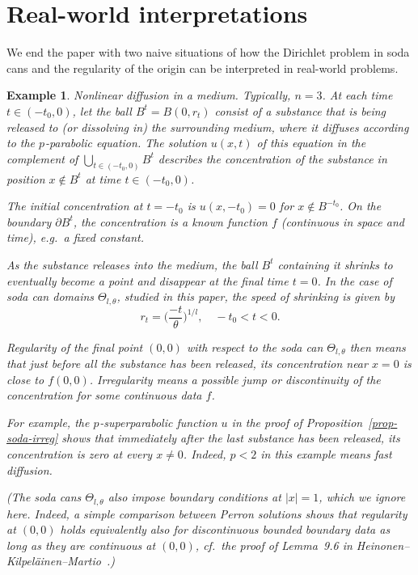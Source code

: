 \documentclass[a4paper, twoside]{article}
\theoremstyle{propositional}
\theoremstyle{descriptive}
\newtheorem{example}[thm]{Example}
\numberwithin{equation}{section}
\newcommand{\p}{{$p\mspace{1mu}$}}
\newcommand{\bdy}{\partial}
\begin{document}
\section{Real-world interpretations}
\label{sect-real-world}

We end the paper with two naive situations
of how the Dirichlet problem in soda cans and the regularity of the origin 
can be interpreted in real-world problems.


\begin{example}  \label{ex-diffusion}
\emph{Nonlinear diffusion in a medium.}
Typically, $n=3$.
At each time $t\in(-t_0,0)$, 
let the ball $B^t=B(0,r_t)$ consist of a substance that 
is being released to (or dissolving in) the surrounding medium, where it diffuses 
according to the \p-parabolic equation.
The solution $u(x,t)$ of this equation in the complement of $\bigcup_{t\in(-t_0,0)}B^t$
describes the concentration  
of the substance in position $x\notin B^t$ at time $t\in(-t_0,0)$.


The initial concentration at $t=-t_0$ is $u(x,-t_0)=0$ for $x\notin B^{-t_0}$.
On the boundary $\bdy B^t$, the concentration is 
a known function $f$ (continuous in space and time),
e.g.\  a fixed constant.

As the substance releases into the medium, the ball $B^t$ containing it
shrinks to eventually become a point and disappear at the final time $t=0$.
In the case of soda can domains $\Theta_{l,\theta}$, studied in this paper, the speed of 
shrinking is given by 
\[
r_t=\biggl(\frac{-t}{\theta}\biggr)^{1/l},  \quad -t_0<t<0.
\]


Regularity of the final point $(0,0)$ with respect to the soda can $\Theta_{l,\theta}$
then means that just before all the substance 
has been released, its concentration near
$x=0$ is close to $f(0,0)$.
Irregularity means a possible jump or discontinuity of the concentration
for some continuous data $f$.

For example, the \p-superparabolic function $u$ in the proof of Proposition~\ref{prop-soda-irreg}
shows that immediately after  the last substance has been released,
its concentration is zero at every $x\ne0$.
Indeed, $p<2$ in this example means fast diffusion.


(The soda cans $\Theta_{l,\theta}$ also impose
boundary conditions at $|x|=1$, which we ignore here. 
Indeed, a simple comparison between Perron solutions shows that
regularity at $(0,0)$ holds 
equivalently also for discontinuous bounded boundary data
as long as they are continuous at $(0,0)$, 
cf.\  the proof of Lemma~9.6 in  Heinonen--Kilpel\"ainen--Martio~\cite{HeKiMa}.)
\end{example}
\end{document}
